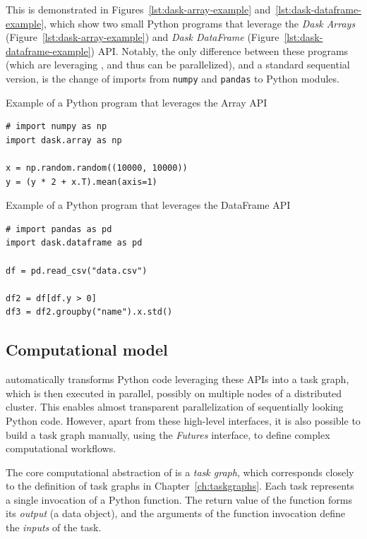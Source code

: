 This is demonstrated in Figures~\ref{lst:dask-array-example} and~\ref{lst:dask-dataframe-example}, which show two
small Python programs that leverage the \emph{Dask Arrays} (Figure~\ref{lst:dask-array-example}) and \emph{Dask DataFrame}
(Figure~\ref{lst:dask-dataframe-example}) API.
Notably, the only difference between these programs (which are leveraging \dask{},
and thus can be parallelized), and a standard sequential version, is the change of imports from
\texttt{numpy} and \texttt{pandas} to \dask{} Python modules.

\begin{listing}[h]
	\caption{Example of a Python program that leverages the \dask{} Array API}
	\label{lst:dask-array-example}
	\begin{verbatim}
# import numpy as np
import dask.array as np

x = np.random.random((10000, 10000))
y = (y * 2 + x.T).mean(axis=1)
	\end{verbatim}
\end{listing}

\begin{listing}[h]
	\caption{Example of a Python program that leverages the \dask{} DataFrame API}
	\label{lst:dask-dataframe-example}
	\begin{verbatim}
# import pandas as pd
import dask.dataframe as pd

df = pd.read_csv("data.csv")

df2 = df[df.y > 0]
df3 = df2.groupby("name").x.std()
	\end{verbatim}
\end{listing}

\subsection*{Computational model}
\dask{} automatically transforms Python code leveraging these APIs into a task
graph, which is then executed in parallel, possibly on multiple nodes of a distributed cluster.
This enables almost transparent parallelization of sequentially looking Python code. However, apart
from these high-level interfaces, it is also possible to build a task graph manually, using the
\emph{Futures} interface, to define complex computational workflows.

The core computational abstraction of \dask{} is a \emph{task graph}, which
corresponds closely to the definition of task graphs in Chapter~\ref{ch:taskgraphs}. Each task
represents a single invocation of a Python function. The return value of the function forms its
\emph{output} (a data object), and the arguments of the function invocation define the
\emph{inputs} of the task.

